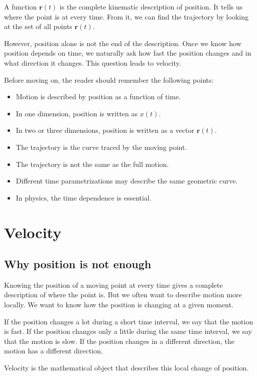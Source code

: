 A function \(\mathbf{r}(t)\) is the complete kinematic description of position. It tells us where the point is at every time. From it, we can find the trajectory by looking at the set of all points \(\mathbf{r}(t)\).

However, position alone is not the end of the description. Once we know how position depends on time, we naturally ask how fast the position changes and in what direction it changes. This question leads to velocity.

Before moving on, the reader should remember the following points:

\begin{itemize}
    \item Motion is described by position as a function of time.
    \item In one dimension, position is written as \(x(t)\).
    \item In two or three dimensions, position is written as a vector \(\mathbf{r}(t)\).
    \item The trajectory is the curve traced by the moving point.
    \item The trajectory is not the same as the full motion.
    \item Different time parametrizations may describe the same geometric curve.
    \item In physics, the time dependence is essential.
\end{itemize}

\section{Velocity}

\subsection{Why position is not enough}

Knowing the position of a moving point at every time gives a complete description of where the point is. But we often want to describe motion more locally. We want to know how the position is changing at a given moment.

If the position changes a lot during a short time interval, we say that the motion is fast. If the position changes only a little during the same time interval, we say that the motion is slow. If the position changes in a different direction, the motion has a different direction.

Velocity is the mathematical object that describes this local change of position.

